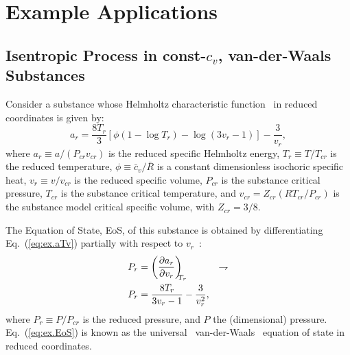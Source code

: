 \section{Example Applications}

    \subsection{Isentropic Process in const-$c_v$, van-der-Waals Substances}

    Consider         a         substance         whose         Helmholtz          characteristic
    function~\cite{1986-JonesJB+HawkinsGA-Wiley} in reduced coordinates is given by:
    \begin{equation}
        a_r = \frac{8T_r}{3}\left[
                  \phi\left(1 - \log T_r\right) - \log(3v_r - 1)
              \right] - \frac{3}{v_r},
        \label{eq:ex.aTv}
    \end{equation}
    \noindent where $a_r \equiv a / (P_{cr}v_{cr})$ is the reduced  specific  Helmholtz  energy,
    $T_r \equiv T / T_{cr}$ is the reduced temperature, $\phi \equiv \bar{c}_v / \bar{R}$  is  a
    constant dimensionless isochoric specific heat, $v_r \equiv  v  /  v_{cr}$  is  the  reduced
    specific volume, $P_{cr}$ is the substance critical  pressure,  $T_{cr}$  is  the  substance
    critical temperature, and $v_{cr} = Z_{cr}(RT_{cr}/P_{cr})$ is the substance model  critical
    specific volume, with $Z_{cr} = 3/8$.

    The  Equation  of  State,  EoS,  of  this   substance   is   obtained   by   differentiating
    Eq.~(\ref{eq:ex.aTv}) partially with respect to $v_r$~\cite{1986-JonesJB+HawkinsGA-Wiley}:
    \begin{align}
        P_r & = \left(\frac{\partial {{a_r}}}{\partial {{v_r}}}\right)_{\!\!\!{T_r}} & \rightharpoondown\\
        P_r & = \frac{8T_r}{3v_r - 1} - \frac{3}{v_r^2}, \label{eq:ex.EoS}
    \end{align}
    \noindent where $P_r \equiv P / P_{cr}$ is the reduced pressure, and $P$  the  (dimensional)
    pressure. Eq.~(\ref{eq:ex.EoS}) is  known  as  the  universal~\cite{1899-MaxwellJC-Longmans}
    van-der-Waals~\cite{2006-BejanA-Wiley,                           2013-CengelYA+BolesMA-AMGH,
    1986-JonesJB+HawkinsGA-Wiley} equation of state in reduced coordinates.

